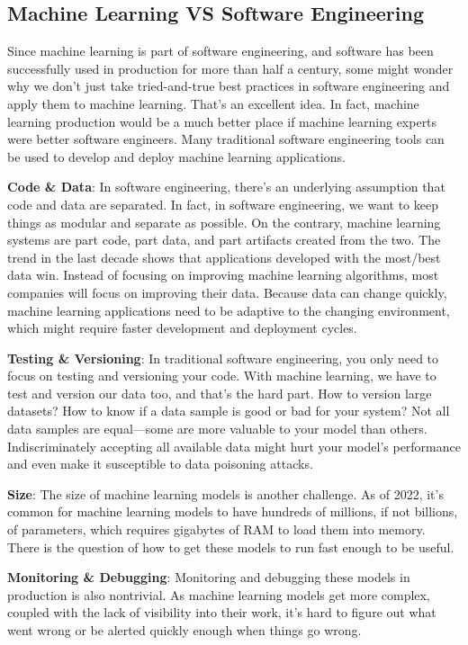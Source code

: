 \subsection{Machine Learning VS Software Engineering}

Since machine learning is part of software engineering, and software has been successfully used in production for more
than half a century, some might wonder why we don't just take tried-and-true best practices in software engineering and
apply them to machine learning. That's an excellent idea. In fact, machine learning production would be a much better
place if machine learning experts were better software engineers. Many traditional software engineering tools can be
used to develop and deploy machine learning applications.


\bit
\item \textbf{Code \& Data}: In software engineering, there's an underlying assumption that code and data are
separated. In fact, in software engineering, we want to keep things as modular and separate as possible. On the
contrary, machine learning systems are part code, part data, and part artifacts created from the two. The trend in
the last decade shows that applications developed with the most/best data win. Instead of focusing on improving
machine learning algorithms, most companies will focus on improving their data. Because data can change quickly,
machine learning applications need to be adaptive to the changing environment, which might require faster development
and deployment cycles.
\item \textbf{Testing \& Versioning}: In traditional software engineering, you only need to focus on testing and
versioning your code. With machine learning, we have to test and version our data too, and that's the hard part. How
to version large datasets? How to know if a data sample is good or bad for your system? Not all data samples are
equal—some are more valuable to your model than others. Indiscriminately accepting all available data might hurt your
model's performance and even make it susceptible to data poisoning attacks.
\item \textbf{Size}: The size of machine learning models is another challenge. As of 2022, it's common for machine
learning models to have hundreds of millions, if not billions, of parameters, which requires gigabytes of RAM to load
them into memory. There is the question of how to get these models to run fast enough to be useful.
\item \textbf{Monitoring \& Debugging}: Monitoring and debugging these models in production is also nontrivial. As
machine learning models get more complex, coupled with the lack of visibility into their work, it's hard to figure out
what went wrong or be alerted quickly enough when things go wrong.
\eit

